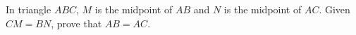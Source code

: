 In triangle $ABC$, $M$ is the midpoint of $AB$ and $N$ is the midpoint of $AC$. Given $CM=BN$, prove that $AB=AC$.
